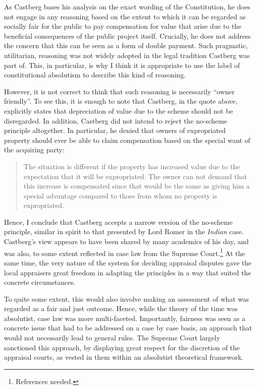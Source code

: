 As Castberg bases his analysis on the exact wording of the Constitution, he does not engage in any reasoning based on the extent to which it can be regarded as socially fair for the public to pay compensation for value that arise due to the beneficial consequences of the public project itself. Crucially, he does not address the concern that this can be seen as a form of double payment. Such pragmatic, utilitarian, reasoning was not widely adopted in the legal tradition Castberg was part of. This, in particular, is why I think it is appropriate to use the label of constitutional absolutism to describe this kind of reasoning. 

However, it is not correct to think that such reasoning is necessarily ``owner friendly''. To see this, it is enough to note that Castberg, in the quote above, explicitly states that depreciation of value due to the scheme should not be disregarded. In addition, Castberg did not intend to reject the no-scheme principle altogether. In particular, he denied that owners of expropriated property should ever be able to claim compensation based on the special want of the acquiring party:

\begin{quote}
The situation is different if the property has increased value due to the expectation that it will be expropriated. The owner can not demand that this increase is compensated since that would be the same as giving him a special advantage compared to those from whom no property is expropriated.
\end{quote}

Hence, I conclude that Castberg accepts a narrow version of the no-scheme principle, similar in spirit to that presented by Lord Romer in the {\it Indian} case. Castberg's view appears to have been shared by many academics of his day, and was also, to some extent reflected in case law from the Supreme Court.\footnote{References needed.} At the same time, the very nature of the system for deciding appraisal disputes gave the local appraisers great freedom in adapting the principles in a way that suited the concrete circumstances.

To quite some extent, this would also involve making an assessment of what was regarded as a fair and just outcome. Hence, while the theory of the time was absolutist, case law was more multi-faceted. Importantly, fairness was seen as a concrete issue that had to be addressed on a case by case basis, an approach that would not necessarily lead to general rules. The Supreme Court largely sanctioned this approach, by displaying great respect for the discretion of the appraisal courts, as vested in them within an absolutist theoretical framework.

